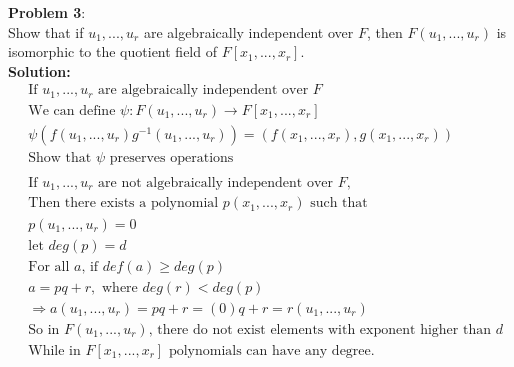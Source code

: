 \documentclass[11pt]{article}
\newcommand{\prob}[3]{\begin{flushleft}
        \textbf{Problem #1}: \\
        #2 
		\textbf{Solution:}\\ 
		#3

\end{flushleft}}
\begin{document}
\prob{3}{
Show that if $u_1, ..., u_r$ are algebraically independent over $F$, then $F(u_1, ..., u_r)$ is isomorphic to the quotient field of $F[x_1, ..., x_r]$.\\
}{\begin{align*}
&\text{If $u_1, ..., u_r$ are algebraically independent over $F$}\\
&\text{We can define }\psi : F(u_1, ..., u_r) \rightarrow F[x_1, ..., x_r]\\
&\psi(f(u_1, ..., u_r)g^{-1}(u_1, ..., u_r)) = (f(x_1, ..., x_r), g(x_1, ..., x_r))\\
&\text{Show that $\psi$ preserves operations}\\
&\\
&\text{If $u_1, ..., u_r$ are not algebraically independent over $F$, }\\
&\text{Then there exists a polynomial $p(x_1, ..., x_r)$ such that }\\
&p(u_1, ..., u_r) = 0\\
&\text{let $deg(p) = d$ }\\
&\text{For all $a$, if } def(a) \geq deg(p)\\
&a = pq + r,\text{ where } deg(r) < deg(p)\\
&\Rightarrow a(u_1, ..., u_r) = pq + r = (0)q + r = r(u_1, ..., u_r)\\
&\text{So in $F(u_1, ..., u_r)$, there do not exist elements with exponent higher than $d$}\\
&\text{While in $F[x_1, ..., x_r]$ polynomials can have any degree.}
\end{align*}}
\end{document}
